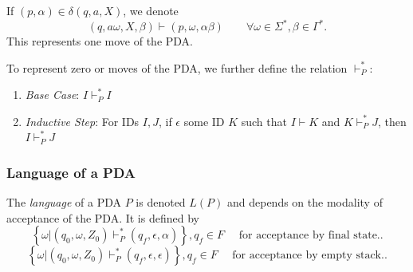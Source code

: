 \begin{notation}[$\vdash$]
  If $\left( p,\alpha \right) \in \delta\left( q,a,X \right)$, we denote
  \[\left( q,a\omega,X,\beta \right) \vdash \left( p,\omega,\alpha\beta
  \right)\qquad \forall \omega\in \Sigma^{*},\beta\in \Gamma^{*}.\]
  This represents one move of the PDA.
\end{notation}
\begin{notation}[$\vdash^{*}_P$]
  To represent zero or moves of the PDA, we further define the relation $\vdash^{*}_P$:
  \begin{enumerate}
    \item \textit{Base Case}: $I\vdash^{*}_P I$ 
    \item \textit{Inductive Step}: For IDs $I,J$, if $\epsilon$ some ID $K$
      such that $I\vdash K$ and $K\vdash^{*}_P J$, then $I\vdash^{*}_P J$
  \end{enumerate}
\end{notation}

\subsubsection{Language of a PDA}
\begin{definition}
  The \textit{language} of a PDA $P$ is denoted $L(P)$ and depends on the modality of acceptance
  of the PDA\@. It is defined by
  \[\left\{ \omega|\left( q_0,\omega,Z_0 \right) \vdash_P^{*}\left( q_f,\epsilon,\alpha \right) \right\},q_f\in F \quad\text{ for acceptance by final state.}.\] 
  \[\left\{ \omega|\left( q_0,\omega,Z_0 \right) \vdash_P^{*}\left( q_f,\epsilon,\epsilon \right) \right\},q_f\in F \quad\text{ for acceptance by empty stack.}.\] 
\end{definition}

